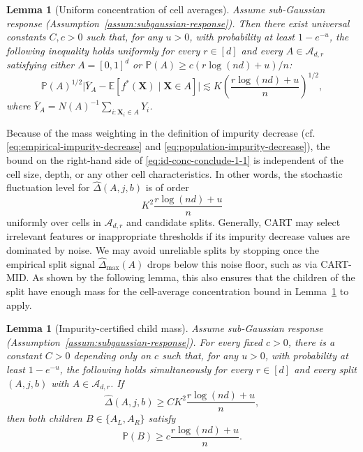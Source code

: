 \documentclass[11pt]{article}
\theoremstyle{plain}
\newtheorem{lemma}[theorem]{Lemma}
\theoremstyle{definition}
\theoremstyle{remark}
\theoremstyle{plain}
\newcommand{\bX}{\mathbf{X}}
\renewcommand{\P}{\mathbb{P}}
\newcommand{\E}{\mathbb{E}}
\newcommand{\1}{\mathbbm{1}}
\begin{document}
\begin{lemma}[Uniform concentration of cell averages]
\label{lemma:unif_conc_cell_ave}
Assume sub-Gaussian response (Assumption~\ref{assum:subgaussian-response}). Then there exist universal constants $C,c>0$ such that, for any $u>0$, with probability at least $1-e^{-u}$, the following inequality holds uniformly for every $r\in[d]$ and every $A\in\mathcal{A}_{d,r}$ satisfying either $A=[0,1]^d$ or $\P(A)\ge c(r\log(nd)+u)/n$:
\begin{equation}
\label{eq:conclude-cell-mean}
\P(A)^{1/2}
\bigl|\overline Y_A-\E[f^*(\bX)\mid \bX\in A]\bigr|
\lesssim
K
\left(\frac{r\log(nd)+u}{n}\right)^{1/2},
\end{equation}
where $\overline Y_A=N(A)^{-1}\sum_{i:\bX_i\in A} Y_i$.
\end{lemma}

Because of the mass weighting in the definition of impurity decrease (cf. \eqref{eq:empirical-impurity-decrease} and \eqref{eq:population-impurity-decrease}), the bound on the right-hand side of \eqref{eq:id-conc-conclude-1-1} is independent of the cell size, depth, or any other cell characteristics. 
In other words, the stochastic fluctuation level for $\widehat\Delta(A,j,b)$ is of order
\begin{equation} \label{eq:noise-floor}
    K^2\frac{r\log(nd)+u}{n}
\end{equation}
uniformly over cells in $\mathcal{A}_{d,r}$ and candidate splits. 
Generally, CART may select irrelevant features or inappropriate thresholds if its impurity decrease values are dominated by noise.
We may avoid unreliable splits by stopping once the empirical split signal $\widehat\Delta_{\max}(A)$ drops below this noise floor, such as via CART-MID.
As shown by the following lemma, this also ensures that the children of the split have enough mass for the cell-average concentration bound in Lemma~\ref{lemma:unif_conc_cell_ave} to apply.

\begin{lemma}[Impurity-certified child mass]
\label{lem:mid-child-mass}
Assume sub-Gaussian response (Assumption~\ref{assum:subgaussian-response}).
For every fixed $c>0$, there is a constant $C>0$ depending only on $c$ such
that, for any $u>0$, with probability at least $1-e^{-u}$, the following
holds simultaneously for every $r\in[d]$ and every split $(A,j,b)$ with
$A\in\mathcal A_{d,r}$. If
\begin{equation}\label{eq:mid-child-mass-threshold}
\widehat\Delta(A,j,b)
\ge CK^2\frac{r\log(nd)+u}{n},
\end{equation}
then both children $B\in\{A_L,A_R\}$ satisfy
\begin{equation}\label{eq:mid-child-mass-conclusion}
\P(B)\ge c\frac{r\log(nd)+u}{n}.
\end{equation}
\end{lemma}
\end{document}
